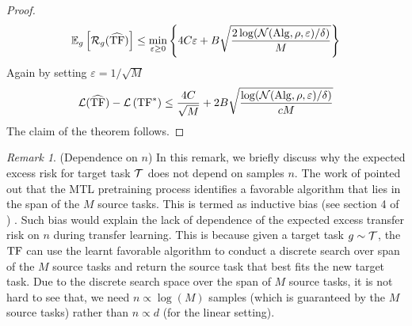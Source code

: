 \documentclass[10pt]{article}
\theoremstyle{plain}
\theoremstyle{definition}
\theoremstyle{remark}
\newtheorem{remark}[theorem]{Remark}
\begin{document}
\begin{proof}
\begin{align*}
\mathbb{E}_{g}\left[\mathcal{R}_{g}(\widehat{\mathrm{TF}})\right] \leq \min _{\varepsilon \geq 0}\left\{4 C \varepsilon+B \sqrt{\frac{2 \log (\mathcal{N}(\mathrm{Alg}, \rho, \varepsilon) / \delta)}{M}}\right\}
\end{align*}
Again by setting $\varepsilon = 1/\sqrt{M}$
\begin{align*}
    \mathcal{L}(\widehat{\mathrm{TF}})-\mathcal{L}\left(\mathrm{TF}^*\right)\leq \dfrac{4 C}{\sqrt{M}}+ 2B \sqrt{\frac{\log (\mathcal{N}(\mathrm{Alg}, \rho, \varepsilon) / \delta)}{c M}}
\end{align*}
The claim of the theorem follows.
\end{proof}
\begin{remark} (Dependence on $n$)
\label{remark:target-risk}
In this remark, we briefly discuss why the expected excess risk for target task $\mathcal{T}$ does not depend on samples $n$.
The work of \citet{li2023transformers} pointed out that the MTL pretraining process identifies a favorable algorithm that lies in the span of the $M$ source tasks.
This is termed as inductive bias (see section 4 of \citet{li2023transformers}) \citep{soudry2018implicit, neyshabur2017geometry}.
Such bias would explain the lack of dependence of the expected excess transfer risk on $n$ during transfer learning.
This is because given a target task $g\sim\mathcal{T}$, the $\mathrm{TF}$ can use the learnt favorable algorithm to conduct a discrete search over span of the $M$ source tasks and return the source task that best fits the new target task. Due to the discrete search space over the span of $M$ source tasks, it is not hard to see that, we need $n \propto \log (M)$ samples (which is guaranteed by the $M$ source tasks) rather than $n \propto d$ (for the linear setting).
\end{remark}
\end{document}
